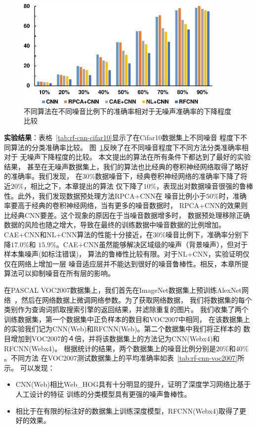 \documentclass[doctor]{ustcthesis}
\begin{document}
\begin{figure}[t]
    \vspace{1em}
    \centering
    \includegraphics[clip=true, width=0.9\textwidth]{rf-cnn-cifar-decline}
    \caption{不同算法在不同噪音比例下的准确率相对于无噪声准确率的下降程度比较}
    \label{fig:rf-cnn-cifar-decline}
\end{figure}
\textbf{实验结果}：表格~\ref{tab:rf-cnn-cifar10}显示了在Cifar10数据集上不同噪音
程度下不同算法的分类准确率比较。
图~\ref{fig:rf-cnn-cifar-decline}反映了在不同噪音程度下不同方法分类准确率相对于
无噪声下降程度的比较。
本文提出的算法在所有条件下都达到了最好的实验结果，
甚至在无噪声数据集上，我们的算法也比经典的卷积神经网络取得了略好的准确率。我们发现，
在$30\%$数据噪音下，经典卷积神经网络的准确率下降了将近$20\%$，相比之下，本章提出的算法
仅下降了$10\%$，表现出对数据噪音很强的鲁棒性。此外，我们发现数据预处理方法RPCA+CNN在
噪音比例小于$50\%$时，准确率要高于经典的卷积神经网络，当有更多的噪音数据时，
RPCA+CNN的效果则比经典CNN要差。这个现象的原因在于当噪音数据增多时，
数据预处理移除正确数据的风险也随之增大，导致在最终的训练数据中噪音数据的比例增加。
CAE+CNN和NL+CNN算法的性能十分接近，在$30\%$噪音比例下，准确率分别下降$17.0\%$和
$15.9\%$。CAE+CNN虽然能够解决区域级的噪声（背景噪声），但对于样本集噪声(如标注错误)，
算法的鲁棒性比较有限。对于NL+CNN，实验证明仅仅在网络上增加一层
噪音适应层并不能达到很好的噪音鲁棒性。相反，本章所提算法可以抑制噪音在所有层的影响。

在PASCAL VOC2007数据集上，我们首先在ImageNet数据集上预训练AlexNet网络~\cite{krizhevsky2012imagenet}，然后在网络数据上微调网络参数。为了获取网络数据，
我们将数据集的每个类别作为查询词抓取搜索引擎的返回结果，并滤除重复的图片。
我们收集了两个训练数据集，第一个数据集中正负样本的数目和VOC2007中相同，
在该数据集上的实验我们记为CNN(Web)和RFCNN(Web)。第二个数据集中我们将正样本的
数目增加到VOC2007的４倍，并将该数据集上的方法记为CNN(Webx4)和RFCNN(Webx4)。
根据统计的结果，两个数据集上的噪音比例分别是$20\%$和$40\%$。不同方法
在VOC2007测试数据集上的平均准确率如表~\ref{tab:rf-cnn-voc2007}所示。
可以发现：
\begin{itemize}\setlength{\itemsep}{-0.2em}
    \item CNN(Web)相比Web\_HOG具有十分明显的提升，证明了深度学习网络比基于人工设计的特征
        训练的分类模型具有更强的噪声鲁棒性。
    \item 相比于在有限的标注好的数据集上训练深度模型，RFCNN(Webx4)取得了更好的效果。
\end{itemize}
\end{document}
